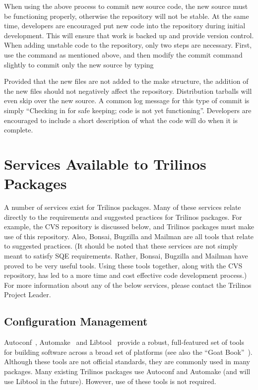 \documentclass[12pt,relax]{TrilinosDevGuide}
\begin{document}
\begin{enumerate}
When using the above process to commit new source code, the new source must 
be functioning properly, otherwise the repository will not be stable.  
At the same time, developers are encouraged put new code into the repository 
during initial development.  This will ensure that work is backed up and 
provide version control.  When adding unstable code to the repository, only
two steps are necessary.  First, use the  command as 
mentioned above, and then modify the commit command slightly to commit only 
the new source by typing


Provided that the new files are not added to the make structure, the addition 
of the new files should not negatively affect the repository.  Distribution 
tarballs will even skip over the new source.  A common log message for this 
type of commit is simply ``Checking in for safe keeping; code is not yet 
functioning''.  Developers are encouraged to include a short description of 
what the code will do when it is complete.
\end{enumerate}

\section{Services Available to Trilinos Packages}
\label{Section:AvailableServices}
A number of services exist for Trilinos packages.  Many of these services 
relate directly to the requirements and suggested practices for Trilinos 
packages.  For example, the CVS repository is discussed below, and 
Trilinos packages must make use of this repository.  Also, Bonsai, Bugzilla 
and Mailman are all tools that relate to suggested practices.  (It should be 
noted that these services are not simply meant to satisfy SQE requirements.  
Rather, Bonsai, Bugzilla and Mailman have proved to be very useful tools.  
Using these tools together, along with the CVS repository, has led to a more 
time and cost effective code development process.)  For more information about 
any of the below services, please contact the Trilinos Project Leader.

\subsection{Configuration Management}
Autoconf~\cite{Autoconf},  Automake~\cite{Automake} and Libtool~\cite{Libtool} 
provide a robust, full-featured set of tools for building software across a 
broad set of platforms (see also the ``Goat Book''~\cite{GoatBook}).  Although 
these tools are not official standards, they are commonly used in many 
packages.  Many existing Trilinos packages use Autoconf and Automake (and will 
use Libtool in the future).  However, use of these tools is not required.
\end{document}
